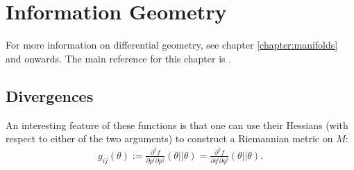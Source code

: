 \chapter{Information Geometry}\label{chapter:info}

    For more information on differential geometry, see chapter \ref{chapter:manifolds} and onwards. The main reference for this chapter is \cite{amari}.

\section{Divergences}


    An interesting feature of these functions is that one can use their Hessians (with respect to either of the two arguments) to construct a Riemannian metric on $M$:
    \begin{gather}
        g_{ij}(\theta) := \frac{\partial^2f}{\partial p^i\partial p^j}(\theta||\theta) = \frac{\partial^2f}{\partial q^i\partial q^j}(\theta||\theta).
    \end{gather}

